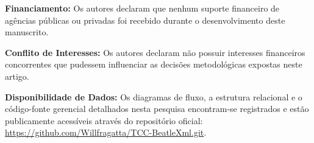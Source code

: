 \documentclass[12pt]{article}
\begin{document}
\textbf{Financiamento:} Os autores declaram que nenhum suporte financeiro de agências públicas ou privadas foi recebido durante o desenvolvimento deste manuscrito.

\textbf{Conflito de Interesses:} Os autores declaram não possuir interesses financeiros concorrentes que pudessem influenciar as decisões metodológicas expostas neste artigo.

\textbf{Disponibilidade de Dados:} Os diagramas de fluxo, a estrutura relacional e o código-fonte gerencial detalhados nesta pesquisa encontram-se registrados e estão publicamente acessíveis através do repositório oficial: \url{https://github.com/Willfragatta/TCC-BeatleXml.git}.



\end{document}
